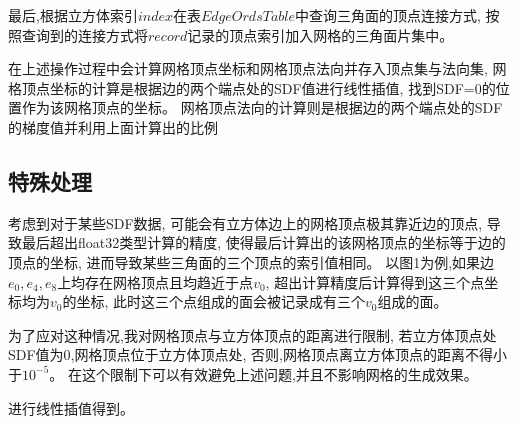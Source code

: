 \documentclass{ctexart}
\begin{document}
最后,根据立方体索引$index$在表$EdgeOrdsTable$中查询三角面的顶点连接方式,
按照查询到的连接方式将$record$记录的顶点索引加入网格的三角面片集中。

在上述操作过程中会计算网格顶点坐标和网格顶点法向并存入顶点集与法向集,
网格顶点坐标的计算是根据边的两个端点处的SDF值进行线性插值,
找到SDF=0的位置作为该网格顶点的坐标。
网格顶点法向的计算则是根据边的两个端点处的SDF的梯度值并利用上面计算出的比例

\subsection{特殊处理}
考虑到对于某些SDF数据,
可能会有立方体边上的网格顶点极其靠近边的顶点,
导致最后超出float32类型计算的精度,
使得最后计算出的该网格顶点的坐标等于边的顶点的坐标,
进而导致某些三角面的三个顶点的索引值相同。
以图1为例,如果边$e_0,e_4,e_8$上均存在网格顶点且均趋近于点$v_0$,
超出计算精度后计算得到这三个点坐标均为$v_0$的坐标,
此时这三个点组成的面会被记录成有三个$v_0$组成的面。

为了应对这种情况,我对网格顶点与立方体顶点的距离进行限制,
若立方体顶点处SDF值为0,网格顶点位于立方体顶点处,
否则,网格顶点离立方体顶点的距离不得小于$10^{-5}$。
在这个限制下可以有效避免上述问题,并且不影响网格的生成效果。

进行线性插值得到。
\end{document}
